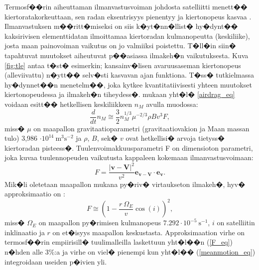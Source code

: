 \documentclass[12pt,a4paper,finnish,margin=2in]{article}
\begin{document}
Termosf��rin aiheuttaman ilmanvastusvoiman johdosta satelliitti menett�� kiertoratakorkeuttaan, sen radan eksentrisyys pienentyy ja  kiertonopeus kasvaa \citep{king_hele_1987}. Ilmanvastuksen m��ritt�miseksi on siis k�yt�nn�llist� hy�dynt�� kaksirivisen elementtidatan ilmoittamaa kiertoradan kulmanopeutta (keskiliike), josta maan painovoiman vaikutus on jo valmiiksi poistettu. T�ll�in siin� tapahtuvat muutokset aiheutuvat p��asiassa ilmakeh�n vaikutuksesta. Kuva \ref{fig:tle} antaa t�st� esimerkin; kansainv�lisen avaruusaseman kiertonopeus (alleviivattu) n�ytt�� selv�sti kasvavan ajan funktiona. T�ss� tutkielmassa hy�dynnet��n \citet{picone_2005} menetelm��, joka kytkee kvantitatiivisesti yhteen muutokset kiertonopeudessa ja ilmakeh�n tiheydess�. \citet{picone_2005} mukaan yht�l� \ref{airdrag_eq} voidaan esitt�� hetkellisen keskiliikkeen $n_M$ avulla muodossa:
\begin{equation} \label{meanmotion_eq}
\frac{d}{dt} n_M \cong \frac{3}{2} n_M^{1/3} \mu^{-2/3} \rho B v^3 F,
\end{equation}
miss� $\mu$ on maapallon gravitaatioparametri (gravitaatiovakion ja Maan massan tulo) 3,986 $\cdot 10^{14}~ \mathrm{m^3 s^{-2}}$ ja $\rho$, $B$, sek� $v$ ovat hetkellisi� arvoja tietyss� kiertoradan pisteess�. Tuulenvoimakkuusparametri F on dimensioton parametri, joka kuvaa tuulennopeuden vaikutusta kappaleen kokemaan ilmanvastusvoimaan:
\begin{equation} \label{F_eq}
F = \frac{\left | \mathbf{v} - \mathbf{V} \right |^2}{v^2} \mathbf{e_{v-V}} \cdot \mathbf{e_{v}}.
\end{equation}
Mik�li oletetaan maapallon mukana py�riv� virtaukseton ilmakeh�, hyv� approksimaatio on \citep{king_hele_1987}:
\begin{equation} \label{F_approx_eq}
F \cong \left ( 1 - \frac{r~\Omega_E}{v} \cos(i) \right )^2,
\end{equation}
miss� $\Omega_E$ on maapallon py�rimisen kulmanopeus $7.292 \cdot 10^{-5} ~\mathrm{s^{-1}}$, $i$ on satelliitin inklinaatio ja $r$ on et�isyys maapallon keskustasta. Approksimaation virhe on termosf��rin empiirisill� tuulimalleilla laskettuun yht�l��n (\ref{F_eq}) n�hden alle 3\%:a ja virhe on viel� pienempi kun yht�l�� (\ref{meanmotion_eq}) integroidaan useiden p�ivien yli. 
\end{document}
